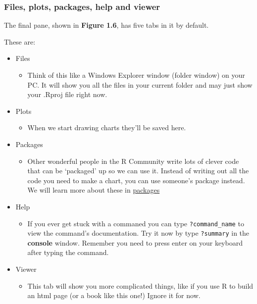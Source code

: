 \documentclass[
]{book}
\providecommand{\tightlist}{%
  \setlength{\itemsep}{0pt}\setlength{\parskip}{0pt}}
\begin{document}
\hypertarget{files-plots-packages-help-and-viewer}{%
\subsubsection{Files, plots, packages, help and viewer}\label{files-plots-packages-help-and-viewer}}

The final pane, shown in \textbf{Figure 1.6}, has five tabs in it by default.

These are:

\begin{itemize}
\tightlist
\item
  Files

  \begin{itemize}
  \tightlist
  \item
    Think of this like a Windows Explorer window (folder window) on your PC. It will show you all the files in your current folder and may just show your .Rproj file right now.
  \end{itemize}
\item
  Plots

  \begin{itemize}
  \tightlist
  \item
    When we start drawing charts they'll be saved here.
  \end{itemize}
\item
  Packages

  \begin{itemize}
  \tightlist
  \item
    Other wonderful people in the R Community write lots of clever code that can be `packaged' up so we can use it. Instead of writing out all the code you need to make a chart, you can use someone's package instead. We will learn more about these in \protect\hyperlink{packages}{packages}
  \end{itemize}
\item
  Help

  \begin{itemize}
  \tightlist
  \item
    If you ever get stuck with a commaned you can type \texttt{?command\_name} to view the command's documentation. Try it now by type \texttt{?summary} in the \textbf{console} window. Remember you need to press enter on your keyboard after typing the command.
  \end{itemize}
\item
  Viewer

  \begin{itemize}
  \tightlist
  \item
    This tab will show you more complicated things, like if you use R to build an html page (or a book like this one!) Ignore it for now.
  \end{itemize}
\end{itemize}
\end{document}
